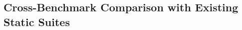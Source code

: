 \documentclass[lettersize,journal]{IEEEtran}
\begin{document}

\subsection{Cross-Benchmark Comparison with Existing Static Suites}
\label{subsec:cross_benchmark}
\end{document}
